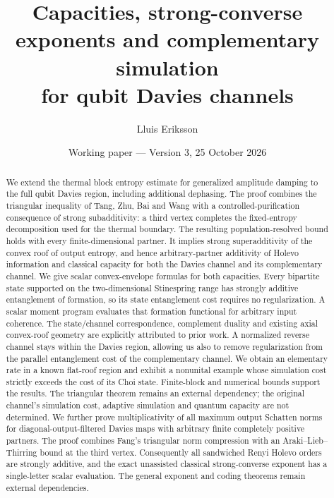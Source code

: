 \documentclass[11pt]{article}
\title{Capacities, strong-converse exponents and complementary simulation\\for qubit Davies channels}
\author{Lluis Eriksson}
\date{Working paper --- Version 3, 25 October 2026}
\begin{document}
\maketitle
\begin{abstract}
We extend the thermal block entropy estimate for generalized amplitude damping to the full qubit Davies region, including additional dephasing. The proof combines the triangular inequality of Tang, Zhu, Bai and Wang with a controlled-purification consequence of strong subadditivity: a third vertex completes the fixed-entropy decomposition used for the thermal boundary. The resulting population-resolved bound holds with every finite-dimensional partner. It implies strong superadditivity of the convex roof of output entropy, and hence arbitrary-partner additivity of Holevo information and classical capacity for both the Davies channel and its complementary channel. We give scalar convex-envelope formulas for both capacities. Every bipartite state supported on the two-dimensional Stinespring range has strongly additive entanglement of formation, so its state entanglement cost requires no regularization. A scalar moment program evaluates that formation functional for arbitrary input coherence. The state/channel correspondence, complement duality and existing axial convex-roof geometry are explicitly attributed to prior work. A normalized reverse channel stays within the Davies region, allowing us also to remove regularization from the parallel entanglement cost of the complementary channel. We obtain an elementary rate in a known flat-roof region and exhibit a nonunital example whose simulation cost strictly exceeds the cost of its Choi state. Finite-block and numerical bounds support the results. The triangular theorem remains an external dependency; the original channel's simulation cost, adaptive simulation and quantum capacity are not determined.
We further prove multiplicativity of all maximum output Schatten norms for diagonal-output-filtered Davies maps with arbitrary finite completely positive partners. The proof combines Fang's triangular norm compression with an Araki--Lieb--Thirring bound at the third vertex. Consequently all sandwiched Renyi Holevo orders are strongly additive, and the exact unassisted classical strong-converse exponent has a single-letter scalar evaluation. The general exponent and coding theorems remain external dependencies.
\end{abstract}
\end{document}
